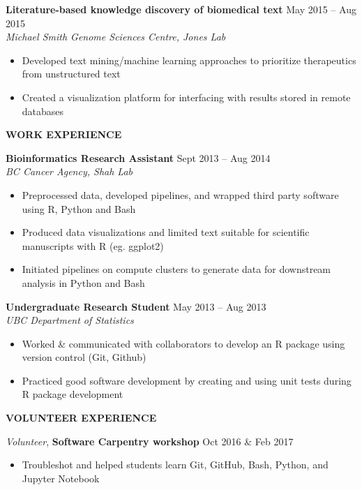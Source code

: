 \documentclass{res}
\renewcommand{\section}[1]{%
  \vspace{0.3in}%
  \centerline{\uppercase{\bf{#1}}}%
  \vspace{-6pt}}
\newcommand{\linehead}[2]{%
  {\bf #1} \hfill #2\\}
\newcommand{\linetitle}[1]{%
  {\sl #1}}
\newcommand{\linevolunteer}[3]{%
  {\sl #3}, {\bf #2} \hfill #1}%
\begin{document}
\begin{resume}
\linehead{Literature-based knowledge discovery of biomedical text}{May 2015 -- Aug 2015}
\linetitle{Michael Smith Genome Sciences Centre, Jones Lab}
\begin{itemize}
  \item Developed text mining/machine learning approaches to prioritize therapeutics from unstructured text
  \item Created a visualization platform for interfacing with results stored in remote databases
\end{itemize}

\vspace{-1em}
\section{Work Experience}

{\bf Bioinformatics Research Assistant} \hfill Sept 2013 -- Aug 2014\\
{\it BC Cancer Agency, Shah Lab}
\begin{itemize}
  \item Preprocessed data, developed pipelines, and wrapped third party software using R, Python and Bash
  \item Produced data visualizations and limited text suitable for scientific manuscripts with R (eg. ggplot2)
  \item Initiated pipelines on compute clusters to generate data for downstream analysis in Python and Bash
\end{itemize}

{\bf Undergraduate Research Student} \hfill May 2013 -- Aug 2013\\
{\it UBC Department of Statistics}
\begin{itemize}
  \item Worked \& communicated with collaborators to develop an R package using version control (Git, Github)
  \item Practiced good software development by creating and using unit tests during R package development
\end{itemize}

\vspace{-1em}
\section{Volunteer experience}
\linevolunteer{Oct 2016 \& Feb 2017}{%
  Software Carpentry workshop}{%
  Volunteer}
\begin{itemize}
  \item Troubleshot and helped students learn Git, GitHub, Bash, Python, and Jupyter Notebook
\end{itemize}


\end{resume}
\end{document}

